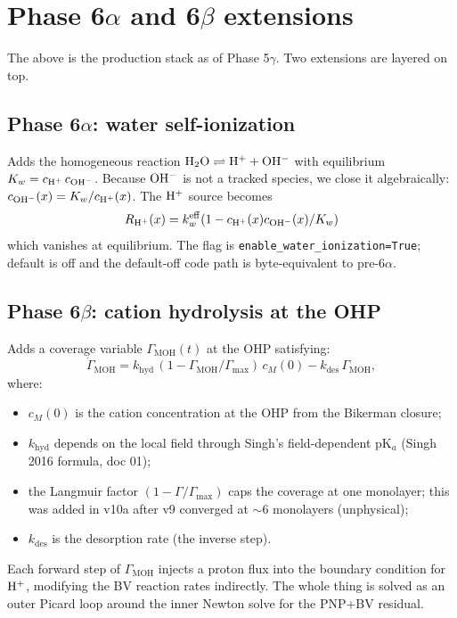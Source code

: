 \documentclass[11pt]{article}
\begin{document}
\section{Phase 6$\alpha$ and 6$\beta$ extensions}

The above is the production stack as of Phase 5$\gamma$. Two
extensions are layered on top.

\subsection{Phase 6$\alpha$: water self-ionization}

Adds the homogeneous reaction $\mathrm{H_2O} \rightleftharpoons
\mathrm{H^+} + \mathrm{OH^-}$ with equilibrium $K_w = c_{\mathrm{H^+}}\, c_{\mathrm{OH^-}}$. Because
$\mathrm{OH^-}$ is not a tracked species, we close it algebraically:
$c_{\mathrm{OH^-}}(x) = K_w / c_{\mathrm{H^+}}(x)$. The $\mathrm{H^+}$ source becomes
\[
  R_{\mathrm{H^+}}(x) = k_w^{\mathrm{eff}} (1 - c_{\mathrm{H^+}}(x) c_{\mathrm{OH^-}}(x) / K_w)
\]
which vanishes at equilibrium. The flag is
\texttt{enable\_water\_ionization=True}; default is off and the
default-off code path is byte-equivalent to pre-6$\alpha$.

\subsection{Phase 6$\beta$: cation hydrolysis at the OHP}

Adds a coverage variable $\Gamma_{\mathrm{MOH}}(t)$ at the OHP
satisfying:
\begin{equation}
  \dot\Gamma_{\mathrm{MOH}}
     = k_{\mathrm{hyd}}\,(1 - \Gamma_{\mathrm{MOH}}/\Gamma_{\max})\,c_M(0)
     - k_{\mathrm{des}}\,\Gamma_{\mathrm{MOH}},
  \label{eq:gamma}
\end{equation}
where:
\begin{itemize}[leftmargin=*]
\item $c_M(0)$ is the cation concentration at the OHP from the
      Bikerman closure;
\item $k_{\mathrm{hyd}}$ depends on the local field through Singh's
      field-dependent pK$_a$ (Singh 2016 formula, doc 01);
\item the Langmuir factor $(1 - \Gamma/\Gamma_{\max})$ caps the
      coverage at one monolayer; this was added in v10a after v9
      converged at $\sim$6 monolayers (unphysical);
\item $k_{\mathrm{des}}$ is the desorption rate (the inverse step).
\end{itemize}
Each forward step of $\Gamma_{\mathrm{MOH}}$ injects a proton flux
into the boundary condition for $\mathrm{H^+}$, modifying the BV reaction
rates indirectly. The whole thing is solved as an outer Picard loop
around the inner Newton solve for the PNP+BV residual.
\end{document}
